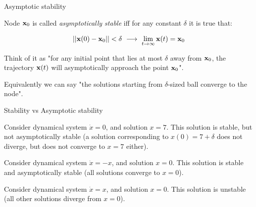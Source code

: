 \documentclass{beamer}
\begin{document}
\begin{frame}{Asymptotic stability}
\begin{flushleft}

Node $\mathbf{x}_0$ is called \emph{asymptotically stable} iff for any constant $\delta$ it is true that:

\begin{equation}
    ||\bo{x}(0) - \bo{x}_0|| < \delta \ \longrightarrow \ 
    \lim_{t\to\infty} \bo{x}(t) = \bo{x}_0
\end{equation}

\bigskip

Think of it as "for any initial point that lies at most $\delta$ away from $\mathbf{x}_0$, the trajectory $\mathbf{x}(t)$ will asymptotically approach the point $\mathbf{x}_0$".

\bigskip

Equivalently we can say "the solutions starting from $\delta$-sized ball converge to the node".

\end{flushleft}
\end{frame}




\begin{frame}{Stability vs Asymptotic stability}
\begin{flushleft}

\begin{example}
Consider dynamical system $\dot{x} = 0$, and solution $x = 7$. This solution is stable, but not asymptotically stable (a solution corresponding to $x(0) = 7+\delta$ does not diverge, but does not converge to $x = 7$ either).
\end{example}

\begin{example}
Consider dynamical system $\dot{x} = -x$, and solution $x = 0$. This solution is stable and asymptotically stable (all solutions converge to $x = 0$).
\end{example}

\begin{example}
Consider dynamical system $\dot{x} = x$, and solution $x = 0$. This solution is unstable (all other solutions diverge from $x = 0$).
\end{example}

\end{flushleft}
\end{frame}
\end{document}
